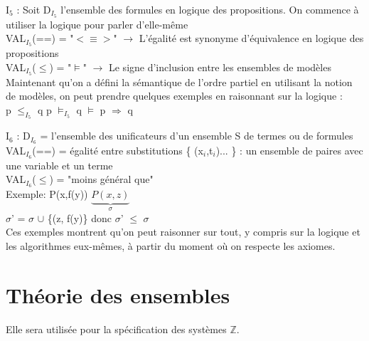 
I$_{5}$ : Soit D$_{I_{5}}$ l'ensemble des formules en logique des propositions. On commence à utiliser la logique pour parler d'elle-même\\
VAL$_{I_{5}}$(==) = "$<\equiv>$" $\rightarrow$ L'égalité est synonyme d'équivalence en logique des propositions\\
VAL$_{I_{5}}$($\leq$) = "$\models$" $\rightarrow$ Le signe d'inclusion entre les ensembles de modèles\\
Maintenant qu'on a défini la sémantique de l'ordre partiel en utilisant la notion de modèles, on peut prendre quelques exemples en raisonnant sur la logique :\\
\newline
p $\leq_{I_{5}}$ q   \hspace{1.5cm} p $\models_{I_{5}}$ q \hspace{1.5cm} $\models$ p $\Rightarrow$ q\\
\newline

I$_{6}$ : D$_{I_{6}}$ = l'ensemble des unificateurs d'un ensemble S de termes ou de formules\\
VAL$_{I_{6}}$(==) = égalité entre substitutions \{ (x$_{i}$,t$_{i}$)... \} : un ensemble de paires avec une variable et un terme\\
VAL$_{I_{6}}$($\leq$) = "moins général que"\\
\newline
Exemple: P(x,f(y)) \hspace{1cm} $\underbrace{P(x,z)}_{\sigma}$\\
$\sigma$' = $\sigma$ $\cup$ \{(z, f(y)\} donc 
$\sigma$' $\leq$ $\sigma$\\

Ces exemples montrent qu'on peut raisonner sur tout, y compris sur la logique et les algorithmes eux-mêmes, à partir du moment où on respecte les axiomes.

\section{Théorie des ensembles}
Elle sera utilisée pour la spécification des systèmes $\mathbb{Z}$.\\

